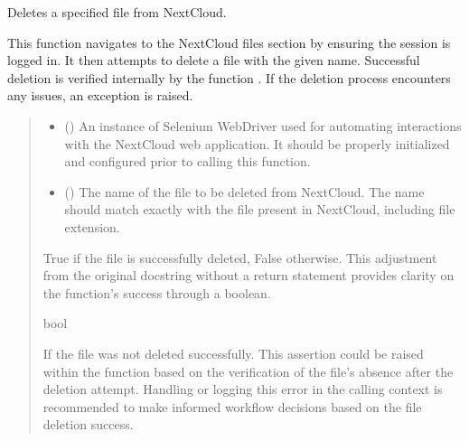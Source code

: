 \documentclass[letterpaper,10pt,english]{sphinxmanual}
\begin{document}
\begin{fulllineitems}
\label{\detokenize{tests:tests.test_file_delete.delete_file}}
\pysigstartsignatures
{}
\pysigstopsignatures
\sphinxAtStartPar
Deletes a specified file from NextCloud.

\sphinxAtStartPar
This function navigates to the NextCloud files section by ensuring the session is logged in. It then attempts to
delete a file with the given name. Successful deletion is verified internally by the function .
If the deletion process encounters any issues, an exception is raised.
\begin{quote}\begin{description}
\begin{itemize}
\item {} 
\sphinxAtStartPar
{} () \textendash{} An instance of Selenium WebDriver used for automating interactions with the NextCloud web
application. It should be properly initialized and configured prior to calling this function.

\item {} 
\sphinxAtStartPar
{} () \textendash{} The name of the file to be deleted from NextCloud. The name should match exactly with the file
present in NextCloud, including file extension.

\end{itemize}

\sphinxAtStartPar
True if the file is successfully deleted, False otherwise. This adjustment from the original docstring
without a return statement provides clarity on the function’s success through a boolean.

\sphinxAtStartPar
bool

\sphinxAtStartPar
{} \textendash{} If the file was not deleted successfully. This assertion could be raised within the
 function based on the verification of the file’s absence after the
deletion attempt. Handling or logging this error in the calling context is recommended to
make informed workflow decisions based on the file deletion success.


\end{description}
\end{quote}
\end{fulllineitems}
\end{document}
